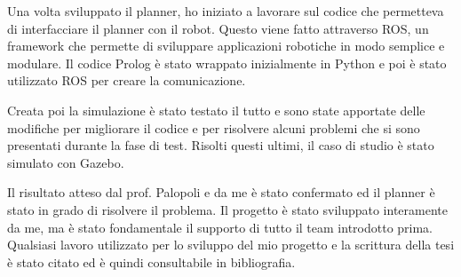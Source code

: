 Una volta sviluppato il planner, ho iniziato a lavorare sul codice che permetteva di interfacciare il planner con il robot. Questo viene fatto attraverso ROS, un framework che permette di sviluppare applicazioni robotiche in modo semplice e modulare.
Il codice Prolog è stato wrappato inizialmente in Python e poi è stato utilizzato ROS per creare la comunicazione.

Creata poi la simulazione è stato testato il tutto e sono state apportate delle modifiche per migliorare il codice e per risolvere alcuni problemi che si sono presentati durante la fase di test. 
Risolti questi ultimi, il caso di studio è stato simulato con Gazebo. 

Il risultato atteso dal prof. Palopoli e da me è stato confermato ed il planner è stato in grado di risolvere il problema. 
Il progetto è stato sviluppato interamente da me, ma è stato fondamentale il supporto di tutto il team introdotto prima. 
Qualsiasi lavoro utilizzato per lo sviluppo del mio progetto e la scrittura della tesi è stato citato ed è quindi consultabile in bibliografia.

